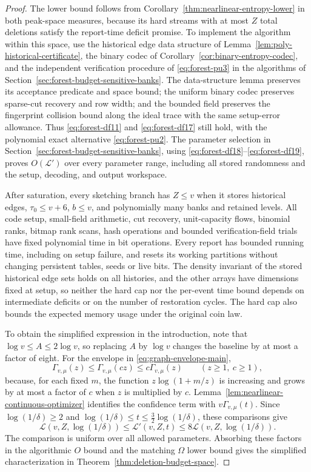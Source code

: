 \documentclass[11pt,letterpaper]{article}
\numberwithin{equation}{section}
\begin{document}
\begin{proof}
The lower bound follows from Corollary~\ref{thm:nearlinear-entropy-lower} in both peak-space measures, because its hard streams with at most $Z$ total deletions satisfy the report-time deficit promise.
To implement the algorithm within this space, use the historical edge data structure of Lemma~\ref{lem:poly-historical-certificate}, the binary codec of Corollary~\ref{cor:binary-entropy-codec}, and the independent verification procedure of \eqref{eq:forest-pu3} in the algorithms of Section~\ref{sec:forest-budget-sensitive-banks}.
The data-structure lemma preserves its acceptance predicate and space bound; the uniform binary codec preserves sparse-cut recovery and row width; and the bounded field preserves the fingerprint collision bound along the ideal trace with the same setup-error allowance.
Thus \eqref{eq:forest-df11} and \eqref{eq:forest-df17} still hold, with the polynomial exact alternative \eqref{eq:forest-pu2}.
The parameter selection in Section~\ref{sec:forest-budget-sensitive-banks}, using \eqref{eq:forest-df18}--\eqref{eq:forest-df19}, proves $O(\mathcal L')$ over every parameter range, including all stored randomness and the setup, decoding, and output workspace.

After saturation, every sketching branch has $Z\le v$ when it stores historical edges, $\tau_0\le v+6$, $b\le v$, and polynomially many banks and retained levels.
All code setup, small-field arithmetic, cut recovery, unit-capacity flows, binomial ranks, bitmap rank scans, hash operations and bounded verification-field trials have fixed polynomial time in bit operations.
Every report has bounded running time, including on setup failure, and resets its working partitions without changing persistent tables, seeds or live bits.
The density invariant of the stored historical edge sets holds on all histories, and the other arrays have dimensions fixed at setup, so neither the hard cap nor the per-event time bound depends on intermediate deficits or on the number of restoration cycles.
The hard cap also bounds the expected memory usage under the original coin law.

To obtain the simplified expression in the introduction, note that $\log v\le A\le2\log v$, so replacing $A$ by $\log v$ changes the baseline by at most a factor of eight.
For the envelope in \eqref{eq:graph-envelope-main},
\[
 \Gamma_{v,\mu}(z)\le\Gamma_{v,\mu}(cz)
 \le c\Gamma_{v,\mu}(z)\qquad(z\ge1,\ c\ge1),
\]
because, for each fixed $m$, the function $z\log(1+m/z)$ is increasing and grows by at most a factor of $c$ when $z$ is multiplied by $c$.
Lemma~\ref{lem:nearlinear-continuous-optimizer} identifies the confidence term with $v\Gamma_{v,\mu}(t)$.
Since $\log(1/\delta)\ge2$ and $\log(1/\delta)\le t\le\tfrac32\log(1/\delta)$, these comparisons give
\[
 \mathcal L(v,Z,\log(1/\delta))
 \le \mathcal L'(v,Z,t)
 \le 8\mathcal L(v,Z,\log(1/\delta)).
\]
The comparison is uniform over all allowed parameters.
Absorbing these factors in the algorithmic $O$ bound and the matching $\Omega$ lower bound gives the simplified characterization in Theorem~\ref{thm:deletion-budget-space}.
\end{proof}
\end{document}
